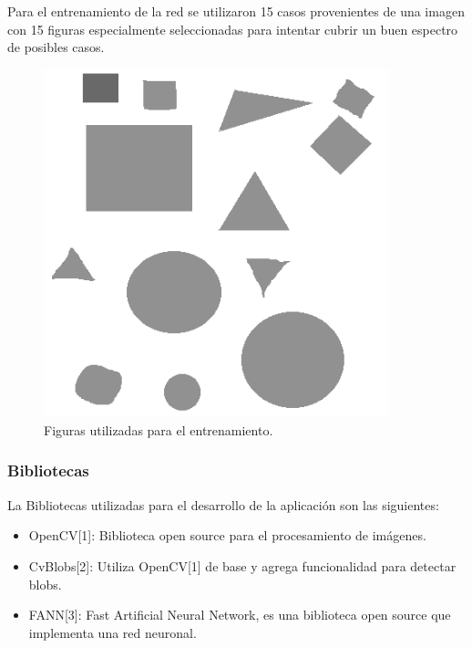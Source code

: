 \documentclass[pdftex,a4paper,12pt]{article}
\begin{document}
Para el entrenamiento de la red se utilizaron 15 casos provenientes de una imagen con 15 figuras especialmente seleccionadas para intentar cubrir un buen espectro de posibles casos.
   
             \begin{figure}[H]
	                  \begin{center}
	                    \includegraphics[width=10cm]{prueba2.png}
	                    \caption{\label{image_soleil} Figuras utilizadas para el entrenamiento. }
	                  \end{center}
	            \end{figure}




\subsubsection{Bibliotecas}
La Bibliotecas utilizadas para el desarrollo de la aplicaci\'on son las
siguientes:
\begin{itemize}
	\item	OpenCV[1]: Biblioteca open source para el procesamiento de im\'agenes.
	\item	CvBlobs[2]: Utiliza OpenCV[1] de base y agrega funcionalidad para
	detectar blobs.
	\item	FANN[3]: Fast Artificial Neural Network, es una biblioteca open source
	que implementa una red neuronal.
\end{itemize}
       
\end{document}
